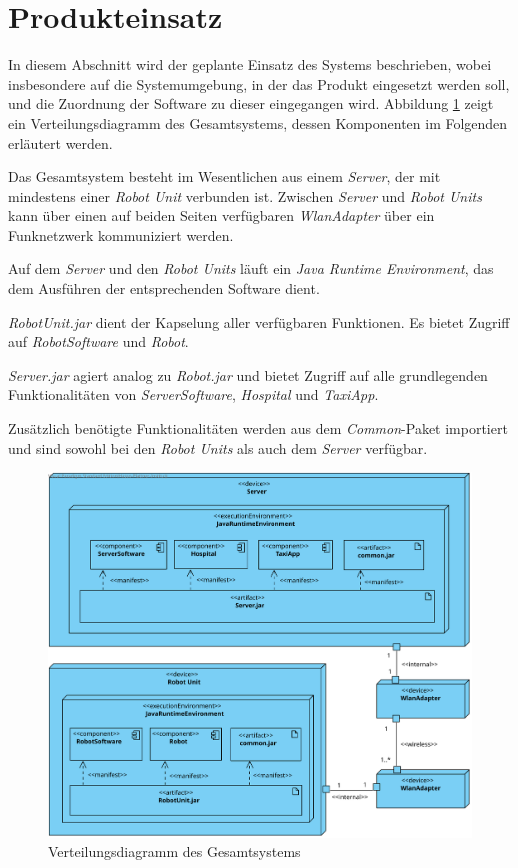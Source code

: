 \section{Produkteinsatz}

In diesem Abschnitt wird der geplante Einsatz des Systems beschrieben, wobei
insbesondere auf die Systemumgebung, in der das Produkt eingesetzt werden soll,
und die Zuordnung der Software zu dieser eingegangen wird. Abbildung \ref{ProdukteinsatzKomp}
zeigt ein Verteilungsdiagramm des Gesamtsystems, dessen Komponenten im Folgenden
erläutert werden.

Das Gesamtsystem besteht im Wesentlichen aus einem \emph{Server}, der mit mindestens einer
\emph{Robot Unit} verbunden ist. Zwischen \emph{Server} und \emph{Robot Units} kann über
einen auf beiden Seiten verfügbaren \emph{Wlan\-Adapter} über ein
Funknetzwerk kommuniziert werden.

Auf dem \emph{Server} und den \emph{Robot Units} läuft ein \emph{Java Runtime Environment},
das dem Ausführen der entsprechenden Software dient.

\emph{RobotUnit.jar} dient der Kapselung aller verfügbaren Funktionen. Es bietet Zugriff
auf \emph{RobotSoftware} und \emph{Robot}.

\emph{Server.jar} agiert analog zu \emph{Robot.jar} und bietet Zugriff auf alle grundlegenden 
Funktionalitäten von \emph{ServerSoftware}, \emph{Hospital} und \emph{TaxiApp}.

Zusätzlich benötigte Funktionalitäten werden aus dem \emph{Common}-Paket importiert und sind
sowohl bei den \emph{Robot Units} als auch dem \emph{Server} verfügbar.

\begin{figure}[H]
	\centering
	\includegraphics[width=1\textwidth]{img/2-Entwurf-9-Produkteinsatz}
	\caption{Verteilungsdiagramm des Gesamtsystems}
	\label{ProdukteinsatzKomp}
\end{figure}
